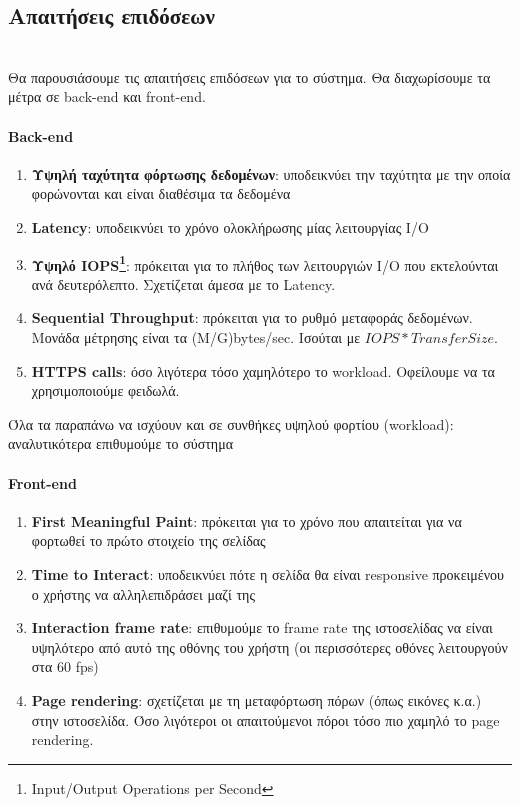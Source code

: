 \subsection{Απαιτήσεις επιδόσεων}
\hfill\\
Θα παρουσιάσουμε τις απαιτήσεις επιδόσεων για το σύστημα. Θα διαχωρίσουμε τα μέτρα σε back-end και front-end.
\paragraph*{Back-end}
\begin{enumerate}
	\item \textbf{Υψηλή ταχύτητα φόρτωσης δεδομένων}: υποδεικνύει την ταχύτητα με την οποία φορώνονται και είναι διαθέσιμα τα δεδομένα
	\item \textbf{Latency}: υποδεικνύει το χρόνο ολοκλήρωσης μίας λειτουργίας I/O
	\item \textbf{Υψηλό IOPS\footnote{Input/Output Operations per Second}}: πρόκειται για το πλήθος των λειτουργιών I/O που εκτελούνται ανά δευτερόλεπτο. Σχετίζεται άμεσα με το Latency.
	\item \textbf{Sequential Throughput}: πρόκειται για το ρυθμό μεταφοράς δεδομένων. Μονάδα μέτρησης είναι τα (M/G)bytes/sec. Ισούται με  $IOPS*TransferSize$.
	\item \textbf{HTTPS calls}: όσο λιγότερα τόσο χαμηλότερο το workload. Οφείλουμε να τα χρησιμοποιούμε φειδωλά.
\end{enumerate} 
Όλα τα παραπάνω να ισχύουν και σε συνθήκες υψηλού φορτίου (workload): αναλυτικότερα επιθυμούμε το σύστημα 

\paragraph*{Front-end}
\begin{enumerate}
	\item \textbf{First Meaningful Paint}: πρόκειται για το χρόνο που απαιτείται για να φορτωθεί το πρώτο στοιχείο της σελίδας
	\item \textbf{Time to Interact}: υποδεικνύει πότε η σελίδα θα είναι responsive προκειμένου ο χρήστης να αλληλεπιδράσει μαζί της
	\item \textbf{Interaction frame rate}: επιθυμούμε το frame rate της ιστοσελίδας να είναι υψηλότερο από αυτό της οθόνης του χρήστη (οι περισσότερες οθόνες λειτουργούν στα 60 fps)
	\item \textbf{Page rendering}: σχετίζεται με τη μεταφόρτωση πόρων (όπως εικόνες κ.α.) στην ιστοσελίδα. Όσο λιγότεροι οι απαιτούμενοι πόροι τόσο πιο χαμηλό το page rendering.
\end{enumerate}

